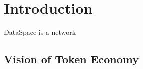 \section{Introduction}
\label{sec:intro}

DataSpace is a network 

\subsection{Vision of Token Economy}

